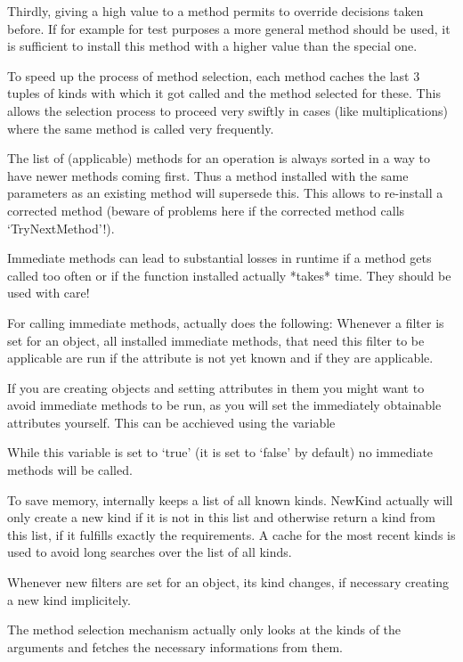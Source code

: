 Thirdly, giving a high value to a method permits to override decisions taken
before. If for example for test purposes a more general method should be
used, it is sufficient to install this method with a higher value than the
special one.

\danger
To speed up the process of method selection, each method caches the last 3
tuples of kinds with which it got called and the method selected for these.
This allows the selection process to proceed very swiftly in cases (like
multiplications) where the same method is called very frequently.

\danger
The list of (applicable) methods for an operation is always sorted in a way
to have newer methods coming first. Thus a method installed with the same
parameters as an existing method will supersede this. This allows to
re-install a corrected method (beware of problems here if the corrected
method calls `TryNextMethod'!).


Immediate methods can lead to substantial losses in runtime if a
method gets called too often or if the function installed actually *takes*
time. They should be used with care!

\danger
For calling immediate methods, {\GAP} actually does the following: 
Whenever a filter is set for an object, all installed immediate methods,
that need this filter to be applicable are run if the attribute is not yet
known and if they are applicable.

\danger
If you are creating objects and setting attributes in them you might want to
avoid immediate methods to be run, as you will set the immediately obtainable
attributes yourself. This can be acchieved using the variable


While this variable is set to `true' (it is set to `false' by default) no
immediate methods will be called.


\danger
To save memory,
{\GAP} internally keeps a list of all known kinds. NewKind actually will
only create a new kind if it is not in this list and otherwise return a
kind from
this list, if it fulfills exactly the requirements. A cache for the most
recent kinds is used to avoid long searches over the list of all kinds.

Whenever new filters are set for an object, its kind changes, if necessary
creating a new kind implicitely.

The method selection mechanism actually only looks at the kinds of the
arguments and fetches the necessary informations from them.

